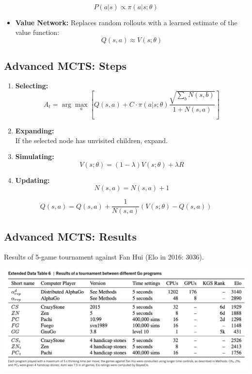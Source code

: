 \documentclass[
  letterpaper,
  DIV=11,
  numbers=noendperiod]{scrreprt}
\providecommand{\tightlist}{%
  \setlength{\itemsep}{0pt}\setlength{\parskip}{0pt}}\usepackage{longtable,booktabs,array}
\begin{document}
\[
P(a|s) \propto \pi(a|s; \theta)
\]

\begin{itemize}
\tightlist
\item
  \textbf{Value Network:} Replaces random rollouts with a learned
  estimate of the value function:\\
  \[ 
  Q(s,a) \approx V(s; \theta) 
  \]
\end{itemize}

\subsection{Advanced MCTS: Steps}\label{advanced-mcts-steps}

\begin{enumerate}
\def\labelenumi{\arabic{enumi}.}
\item
  \textbf{Selecting:}\\
  \[ 
  A_t = \arg\max_a \left[ Q(s, a) + C \cdot \pi(a | s; \theta) \frac{\sqrt{\sum_b N(s, b)}}{1 + N(s, a)} \right] 
  \]
\item
  \textbf{Expanding:}\\
  If the selected node has unvisited children, expand.
\item
  \textbf{Simulating:}\\
  \[ 
  V(s; \theta) = (1 - \lambda) V(s; \theta) + \lambda R 
  \]
\item
  \textbf{Updating:}\\
  \[ 
  N(s, a) = N(s, a) + 1 
  \]
\end{enumerate}

\[ 
Q(s, a) = Q(s, a) + \frac{1}{N(s, a)} \left( V(s; \theta) - Q(s, a) \right) 
\]

\subsection{Advanced MCTS: Results}\label{advanced-mcts-results}

Results of 5-game tournament against Fan Hui (Elo in 2016: 3036).

\includegraphics[width=0.8\linewidth,height=\textheight,keepaspectratio]{lecture11/images/AlphaGoResults.png}
\end{document}
